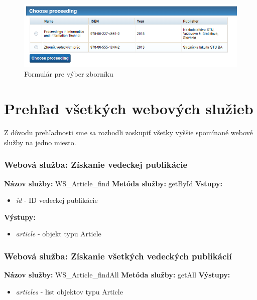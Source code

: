 \documentclass[10pt,oneside,slovak,a4paper]{article}
\begin{document}
\begin{figure} [H]
\centering
\includegraphics[scale=0.4]{forms/Choach choose proceeding.png} 
\caption{Formulár pre výber zborníku}
\end{figure}

\section{Prehľad všetkých webových služieb}
Z dôvodu prehľadnosti sme sa rozhodli zoskupiť všetky vyššie spomínané webové služby na jedno miesto.

\subsubsection{Webová služba: Získanie vedeckej publikácie}
\textbf{Názov služby:} WS\_Article\_find
\textbf{Metóda služby:} getById
\textbf{Vstupy:}
	\begin{itemize}
		\item \textit{id} - ID vedeckej publikácie
	\end{itemize}
\textbf{Výstupy:}
	\begin{itemize}
		\item \textit{article} - objekt typu Article
	\end{itemize}
	
\subsubsection{Webová služba: Získanie všetkých vedeckých publikácií}
\textbf{Názov služby:}  WS\_Article\_findAll
\textbf{Metóda služby:} getAll
\textbf{Výstupy:}
	\begin{itemize}
		\item \textit{articles} - list objektov typu Article
	\end{itemize}
	
\end{document}
